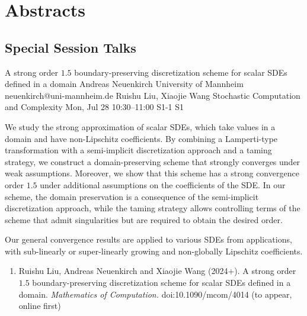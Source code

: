 \chapter{Abstracts}\newpage\section{Special Session Talks}

\begin{talk}
  {A strong order $1.5$ boundary-preserving discretization scheme for scalar SDEs defined in a domain}%
  {Andreas Neuenkirch}%
  {University of Mannheim}%
  {neuenkirch@uni-mannheim.de}%
  {Ruishu Liu, Xiaojie Wang}%
  {Stochastic Computation and Complexity}%
  {Mon, Jul 28 10:30--11:00}%
  {S1-1}%
  {S1}%
    
   
We study the strong approximation of scalar SDEs, which take values in a domain and have non-Lipschitz coefficients.
By combining a Lamperti-type transformation with a semi-implicit discretization approach and a taming 
strategy,  we construct a domain-preserving scheme that strongly converges under weak assumptions. 
Moreover,
we show that this scheme has a strong convergence order $1.5$ under additional assumptions on the coefficients of the SDE. In our scheme, the domain preservation is a consequence of the semi-implicit discretization approach, while the taming strategy allows controlling terms of the scheme that admit singularities but are required to obtain the desired order.

Our general convergence results  are  applied to various SDEs from applications, with sub-linearly or super-linearly growing and non-globally Lipschitz coefficients.


\medskip

\begin{enumerate}
 \item[{[1]}]  Ruishu Liu, Andreas Neuenkirch and Xiaojie Wang (2024+). A strong order $1.5$
 boundary-preserving discretization scheme for scalar SDEs defined in a domain. {\it Mathematics of Computation.} doi:10.1090/mcom/4014 (to appear, online first)
\end{enumerate}

\end{talk}

